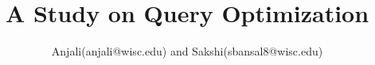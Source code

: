 \documentclass[sigplan,10pt,nonacm]{acmart}
\begin{document}


\title{\textsf{A Study on Query Optimization}}


\author{Anjali(anjali@wisc.edu) and Sakshi(sbansal8@wisc.edu)}




\maketitle





%



{


}
\end{document}
